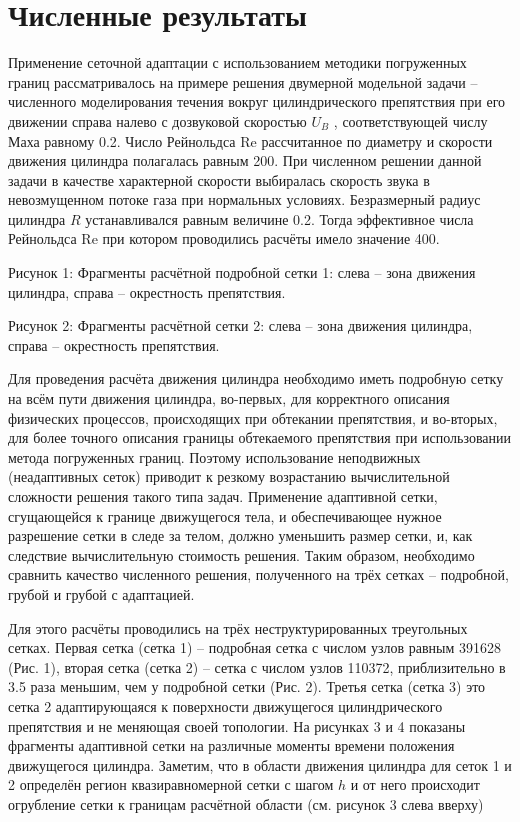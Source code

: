 \chapter{Численные результаты} \label{ch:ch3}
Применение сеточной адаптации с использованием методики погруженных границ рассматривалось на примере решения двумерной модельной задачи – численного моделирования течения вокруг цилиндрического препятствия при его движении справа налево с дозвуковой скоростью $U_B$ , соответствующей числу Маха равному 0.2. Число Рейнольдса Re рассчитанное по диаметру и скорости движения цилиндра полагалась равным 200. При численном решении данной задачи в качестве характерной скорости выбиралась скорость звука в невозмущенном потоке газа при нормальных условиях. Безразмерный радиус цилиндра $R$  устанавливался равным величине 0.2. Тогда эффективное числа Рейнольдса  Re при котором проводились расчёты имело значение 400.

Рисунок 1: Фрагменты расчётной подробной сетки 1: слева – зона движения цилиндра, справа – окрестность препятствия.


Рисунок 2: Фрагменты расчётной сетки 2: слева – зона движения цилиндра, справа – окрестность препятствия.

Для проведения расчёта движения цилиндра необходимо иметь подробную сетку на всём пути движения цилиндра, во-первых, для корректного описания физических процессов, происходящих при обтекании препятствия, и во-вторых, для более точного описания границы обтекаемого препятствия при использовании метода погруженных границ. Поэтому использование неподвижных (неадаптивных сеток) приводит к резкому возрастанию вычислительной сложности решения такого типа задач. Применение адаптивной сетки, сгущающейся к границе движущегося тела, и обеспечивающее нужное разрешение сетки в следе за телом, должно уменьшить размер сетки, и, как следствие вычислительную стоимость решения. Таким образом, необходимо сравнить качество численного решения, полученного на трёх сетках – подробной, грубой и грубой с адаптацией.

Для этого расчёты проводились на трёх неструктурированных треугольных сетках. Первая сетка (сетка 1) – подробная сетка с числом узлов равным 391628 (Рис. 1), вторая сетка (сетка 2) – сетка с числом узлов 110372, приблизительно в 3.5 раза меньшим, чем у подробной сетки (Рис. 2). Третья сетка (сетка 3) это сетка 2 адаптирующаяся к поверхности движущегося цилиндрического препятствия и не меняющая своей топологии. На рисунках 3 и 4 показаны фрагменты адаптивной сетки на различные моменты времени положения движущегося цилиндра. Заметим, что в области движения цилиндра для сеток 1 и 2 определён регион квазиравномерной сетки с шагом $h$  и от него происходит огрубление сетки к границам расчётной области (см. рисунок 3 слева вверху)


